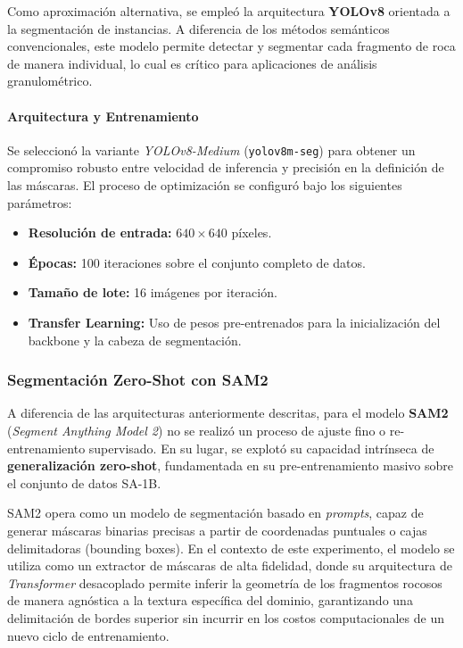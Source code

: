 Como aproximación alternativa, se empleó la arquitectura \textbf{YOLOv8} orientada a la segmentación de instancias. A diferencia de los métodos semánticos convencionales, este modelo permite detectar y segmentar cada fragmento de roca de manera individual, lo cual es crítico para aplicaciones de análisis granulométrico.

\paragraph{Arquitectura y Entrenamiento}
Se seleccionó la variante \textit{YOLOv8-Medium} (\texttt{yolov8m-seg}) para obtener un compromiso robusto entre velocidad de inferencia y precisión en la definición de las máscaras. El proceso de optimización se configuró bajo los siguientes parámetros:
\begin{itemize}
	\item \textbf{Resolución de entrada:} $640 \times 640$ píxeles.
	\item \textbf{Épocas:} 100 iteraciones sobre el conjunto completo de datos.
	\item \textbf{Tamaño de lote:} 16 imágenes por iteración.
	\item \textbf{Transfer Learning:} Uso de pesos pre-entrenados para la inicialización del backbone y la cabeza de segmentación.
\end{itemize}

\subsubsection{Segmentación Zero-Shot con SAM2}

A diferencia de las arquitecturas anteriormente descritas, para el modelo \textbf{SAM2} (\textit{Segment Anything Model 2}) no se realizó un proceso de ajuste fino o re-entrenamiento supervisado. En su lugar, se explotó su capacidad intrínseca de \textbf{generalización zero-shot}, fundamentada en su pre-entrenamiento masivo sobre el conjunto de datos SA-1B.

SAM2 opera como un modelo de segmentación basado en \textit{prompts}, capaz de generar máscaras binarias precisas a partir de coordenadas puntuales o cajas delimitadoras (bounding boxes). En el contexto de este experimento, el modelo se utiliza como un extractor de máscaras de alta fidelidad, donde su arquitectura de \textit{Transformer} desacoplado permite inferir la geometría de los fragmentos rocosos de manera agnóstica a la textura específica del dominio, garantizando una delimitación de bordes superior sin incurrir en los costos computacionales de un nuevo ciclo de entrenamiento.

